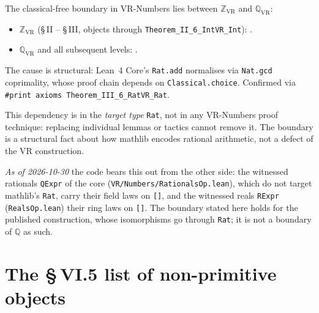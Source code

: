 \begin{remark}
\label{rem:classical_boundary}
\leanok
{}
The classical-free boundary in VR-Numbers lies between $\mathbb{Z}_{\mathrm{VR}}$
and $\mathbb{Q}_{\mathrm{VR}}$:
\begin{itemize}
\item $\mathbb{Z}_{\mathrm{VR}}$ (§\,II -- §\,III, objects through
  \texttt{Theorem\_II\_6\_IntVR\_Int}):
  .
\item $\mathbb{Q}_{\mathrm{VR}}$ and all subsequent levels:
  .
\end{itemize}
The cause is structural: Lean~4 Core's \texttt{Rat.add} normalises via
\texttt{Nat.gcd} coprimality, whose proof chain depends on
\texttt{Classical.choice}.  Confirmed via \texttt{\#print axioms
Theorem\_III\_6\_RatVR\_Rat}.

This dependency is in the \emph{target type} \texttt{Rat}, not in any
VR-Numbers proof technique: replacing individual lemmas or tactics cannot
remove it.  The boundary is a structural fact about how mathlib encodes
rational arithmetic, not a defect of the VR construction.

\emph{As of 2026-10-30} the code bears this out from the other side: the witnessed
rationals \texttt{QExpr} of the core (\texttt{VR/Numbers/RationalsOp.lean}), which do not
target mathlib's \texttt{Rat}, carry their field laws on \texttt{[]}, and the witnessed
reals \texttt{RExpr} (\texttt{RealsOp.lean}) their ring laws on \texttt{[]}.  The
boundary stated here holds for the published construction, whose isomorphisms go
through \texttt{Rat}; it is not a boundary of $\mathbb{Q}$ as such.
\end{remark}

\section{The \S\,VI.5 list of non-primitive objects}
\label{sec:VI5}

